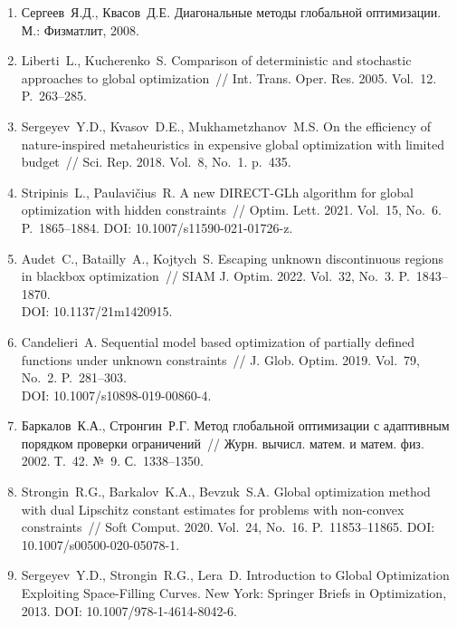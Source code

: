 \documentclass[a4paper,12pt,russian]{article}
\begin{document}
\begin{enumerate}
\item \label{rfa:rulit:Sergeyev2017}
Сергеев~Я.Д., Квасов~Д.Е. Диагональные методы глобальной оптимизации.  М.: Физматлит, 2008. 

\item \label{rfa:rulit:Liberti2005}
Liberti~L., Kucherenko~S. Comparison of deterministic and stochastic approaches to global optimization~// Int. Trans. Oper. Res. 2005. Vol.~12. P.~263--285.

\item \label{rfa:rulit:Sergeyev2018}
Sergeyev~Y.D., Kvasov~D.E., Mukhametzhanov~M.S. On the efficiency of nature-inspired metaheuristics in expensive global optimization with limited budget~// Sci. Rep. 2018. Vol.~8, No.~1. p.~435.

\item \label{rfa:rulit:Stripinis2021}
Stripinis~L., Paulavi{\v c}ius~R. A new {DIRECT}-{GLh} algorithm for global optimization with hidden constraints~// Optim. Lett. 2021. Vol.~15, No.~6. P.~1865--1884.
DOI: 10.1007/s11590-021-01726-z.


\item \label{rfa:rulit:Audet2022}
Audet~C., Batailly~A., Kojtych~S. Escaping unknown discontinuous regions in blackbox optimization~// SIAM J. Optim. 2022. Vol.~32, No.~3. P.~1843--1870. \\DOI: 10.1137/21m1420915.

\item \label{rfa:rulit:Candelieri2019}
Candelieri~A. Sequential model based optimization of partially defined functions
under unknown constraints~// J. Glob. Optim. 2019. Vol.~79, No.~2. P.~281--303. \\DOI: 10.1007/s10898-019-00860-4.

\item \label{rfa:rulit:Sergeyev2003}
Баркалов~К.А., Стронгин~Р.Г. Метод глобальной оптимизации с адаптивным порядком проверки ограничений~// Журн. вычисл. матем. и матем. физ. 2002. Т.~42. №~9. С.~1338--1350.

\item \label{rfa:rulit:Strongin2020}
Strongin~R.G., Barkalov~K.A., Bevzuk~S.A. Global optimization method with dual Lipschitz constant estimates for problems with non-convex constraints~//
Soft Comput. 2020. Vol.~24, No.~16. P.~11853--11865. DOI: 10.1007/s00500-020-05078-1.

\item \label{rfa:rulit:Sergeyev2013}
Sergeyev~Y.D., Strongin~R.G., Lera~D. Introduction to Global Optimization Exploiting Space-Filling Curves. New York: Springer Briefs in Optimization, 2013. DOI: 10.1007/978-1-4614-8042-6.


\end{enumerate}
\end{document}
